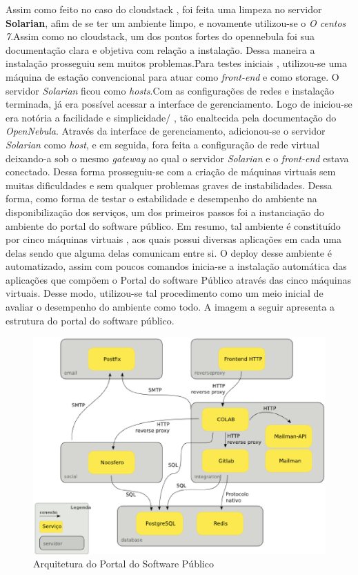 Assim como feito no caso do cloudstack , foi feita uma limpeza no servidor \textbf{Solarian}, afim de se ter um ambiente limpo, e novamente utilizou-se o \textit{O centos 7}.Assim como no cloudstack, um dos pontos fortes do opennebula foi sua documentação clara e objetiva com relação a instalação. Dessa maneira a instalação prosseguiu sem muitos problemas.Para testes iniciais , utilizou-se uma máquina de estação convencional para atuar como \textit{front-end} e como storage. O servidor \textit{Solarian} ficou como \textit{hosts}.Com as configurações de redes e instalação terminada, já era possível acessar a interface de gerenciamento. Logo de iniciou-se era notória a facilidade e simplicidade/ , tão enaltecida pela documentação do \textit{OpenNebula}. Através da interface de gerenciamento, adicionou-se o servidor \textit{Solarian} como \textit{host}, e em seguida, fora feita a configuração de rede virtual deixando-a sob o mesmo \textit{gateway} ao qual o servidor \textit{Solarian} e o \textit{front-end} estava conectado. Dessa forma prosseguiu-se com a criação de máquinas virtuais sem muitas dificuldades e sem qualquer problemas graves de instabilidades. Dessa forma, como forma de testar o estabilidade e desempenho do ambiente na disponibilização dos serviços, um dos primeiros passos foi a instanciação do ambiente do portal do software público. Em resumo, tal ambiente é constituído por cinco máquinas virtuais , aos quais possui diversas aplicações em cada uma delas sendo  que alguma delas comunicam entre si. O deploy desse ambiente é automatizado, assim com poucos comandos inicia-se a instalação automática das aplicações que compõem o Portal do software Público através das cinco máquinas virtuais. Desse modo, utilizou-se tal procedimento como um meio inicial de avaliar o desempenho do ambiente como todo. A imagem a seguir apresenta a estrutura do portal do software público. 

\begin{figure}[!htb]
\centering
\includegraphics [keepaspectratio=true,scale=0.60]{figuras/arquiteturaSPB.eps}
\caption{Arquitetura do Portal do Software Público}
\label{SPB}
\end{figure}

